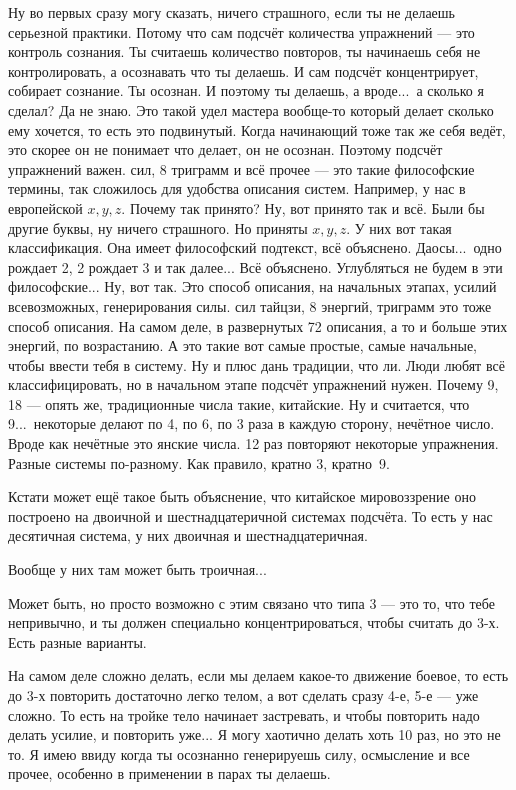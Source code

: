 \T
Ну во первых сразу могу сказать, ничего
страшного, если ты не делаешь серьезной практики. Потому что сам подсчёт количества
упражнений --- это контроль сознания. Ты считаешь количество повторов, ты начинаешь себя не
контролировать, а осознавать что ты делаешь. И сам подсчёт концентрирует, собирает сознание.
Ты осознан.
И поэтому ты делаешь, а вроде...\ а сколько я сделал? Да не знаю. Это такой удел мастера вообще-то
который делает сколько ему хочется, то есть это подвинутый. Когда начинающий тоже так же
себя ведёт, это скорее он не понимает что делает, он не осознан. Поэтому подсчёт упражнений
важен.\hfil\break
{} сил, 8 триграмм и всё прочее --- это такие философские термины, так сложилось для
удобства описания систем.
Например, у нас в европейской $x, y, z$. Почему так принято? Ну, вот принято так и всё.
Были бы другие
буквы, ну ничего страшного. Но приняты $x, y, z$. У них вот такая классификация.
Она имеет
философский подтекст, всё объяснено. Даосы...\ одно рождает 2, 2 рождает 3 и так далее...
Всё
объяснено.
Углубляться не будем в эти философские... Ну, вот так. Это способ описания, на начальных этапах,
усилий всевозможных, генерирования силы.\hfil\break
{} сил тайцзи, 8 энергий, триграмм это тоже
способ описания. На самом деле, в развернутых 72 описания, а то и больше этих энергий, по
возрастанию.
А это такие вот самые простые, самые начальные, чтобы ввести тебя в систему. Ну и плюс дань
традиции, что ли. Люди любят всё классифицировать, но в начальном этапе подсчёт упражнений
нужен.\hfil\break
\indent
Почему 9, 18 --- опять же, традиционные числа такие, китайские.
Ну и считается, что 9...\ некоторые
делают по 4, по 6, по 3 раза в каждую сторону, нечётное число. Вроде как нечётные это янские
числа. 12 раз повторяют некоторые упражнения. Разные системы по-разному.
Как правило,
кратно 3, кратно~9.

\A
Кстати может ещё такое быть объяснение, что китайское мировоззрение оно
построено на двоичной и шестнадцатеричной системах подсчёта. То есть у нас десятичная
система, у них двоичная и шестнадцатеричная.

\T
Вообще у них там может быть троичная...

\A
Может быть, но
просто возможно с этим связано что типа 3 --- это то, что тебе непривычно, и ты должен
специально концентрироваться, чтобы считать до 3-х. Есть разные варианты.

\T
На самом деле сложно делать, если мы делаем какое-то движение боевое, то есть до 3-х повторить
достаточно легко телом, а вот сделать сразу 4-е, 5-е --- уже сложно. То есть на тройке тело
начинает застревать, и чтобы повторить надо делать усилие, и повторить уже...
Я могу хаотично делать
хоть 10 раз, но это не то.
Я имею ввиду когда ты осознанно генерируешь силу, осмысление и все прочее, особенно в
применении в парах ты делаешь.

